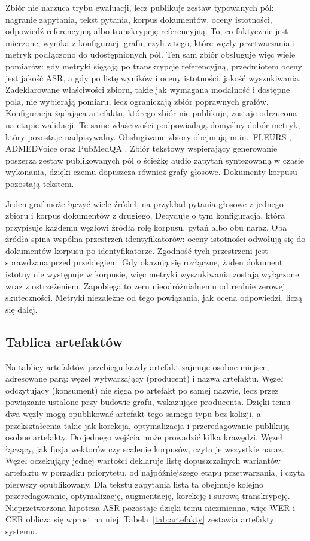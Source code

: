 Zbiór nie narzuca trybu ewaluacji, lecz publikuje zestaw typowanych pól: nagranie zapytania,
tekst pytania, korpus dokumentów, oceny istotności, odpowiedź referencyjną albo transkrypcję
referencyjną. To, co faktycznie jest mierzone, wynika z konfiguracji grafu, czyli z tego, które
węzły przetwarzania i metryk podłączono do udostępnionych pól. Ten sam zbiór obsługuje więc wiele
pomiarów: gdy metryki sięgają po transkrypcję referencyjną, przedmiotem oceny jest jakość ASR, a
gdy po listę wyników i oceny istotności, jakość wyszukiwania. Zadeklarowane właściwości zbioru,
takie jak wymagana modalność i dostępne pola, nie wybierają pomiaru, lecz ograniczają zbiór
poprawnych grafów. Konfiguracja żądająca artefaktu, którego zbiór nie publikuje, zostaje odrzucona
na etapie walidacji. Te same właściwości podpowiadają domyślny dobór metryk, który pozostaje
nadpisywalny. Obsługiwane zbiory obejmują m.in.\ FLEURS \cite{fleurs}, ADMEDVoice
\cite{ADMEDVoice} oraz PubMedQA \cite{jin2019pubmedqa}. Zbiór tekstowy wspierający generowanie poszerza
zestaw publikowanych pól o ścieżkę audio zapytań syntezowaną w czasie wykonania, dzięki czemu
dopuszcza również grafy głosowe. Dokumenty korpusu pozostają tekstem.

Jeden graf może łączyć wiele źródeł, na przykład pytania głosowe z jednego zbioru i korpus
dokumentów z drugiego. Decyduje o tym konfiguracja, która przypisuje każdemu węzłowi źródła rolę
korpusu, pytań albo obu naraz. Oba źródła spina wspólna przestrzeń identyfikatorów: oceny
istotności odwołują się do dokumentów korpusu po identyfikatorze. Zgodność tych przestrzeni jest
sprawdzana przed przebiegiem. Gdy okazują się rozłączne, żaden dokument istotny nie występuje w
korpusie, więc metryki wyszukiwania zostają wyłączone wraz z ostrzeżeniem. Zapobiega to zeru
nieodróżnialnemu od realnie zerowej skuteczności. Metryki niezależne od tego powiązania, jak ocena
odpowiedzi, liczą się dalej.

\subsection{Tablica artefaktów}
Na tablicy artefaktów przebiegu każdy artefakt zajmuje osobne miejsce, adresowane parą: węzeł
wytwarzający (producent) i nazwa artefaktu. Węzeł odczytujący (konsument) nie sięga po artefakt po
samej nazwie, lecz przez powiązanie ustalone przy budowie grafu, wskazujące producenta.
Dzięki temu dwa węzły mogą opublikować artefakt tego samego typu bez kolizji, a przekształcenia
takie jak korekcja, optymalizacja i przeredagowanie publikują osobne artefakty. Do jednego
wejścia może prowadzić kilka krawędzi. Węzeł łączący, jak fuzja wektorów czy scalenie korpusów,
czyta je wszystkie naraz. Węzeł oczekujący jednej wartości deklaruje listę dopuszczalnych
wariantów artefaktu w porządku priorytetu, od najpóźniejszego etapu przetwarzania, i czyta
pierwszy opublikowany. Dla tekstu zapytania lista ta obejmuje kolejno przeredagowanie,
optymalizację, augmentację, korekcję i surową transkrypcję. Nieprzetworzona hipoteza ASR pozostaje
dzięki temu niezmienna, więc WER i CER oblicza się wprost na niej.
Tabela~\ref{tab:artefakty} zestawia artefakty systemu.

